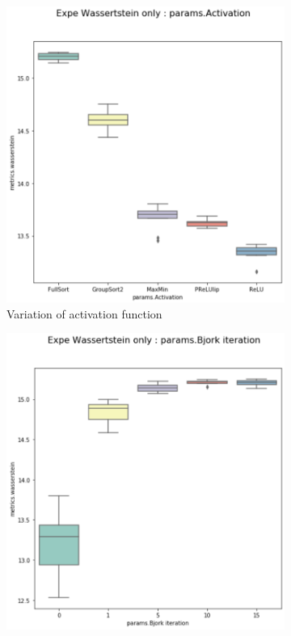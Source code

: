 \begin{figure}
\centering
\begin{subfigure}{.5\textwidth}
  \centering
  \includegraphics[width=1\linewidth]{img/Wassertein_estimation_MLP_activation_param.png}
  \caption{Variation of activation function}
  \label{fig:sub1}
\end{subfigure}%
\begin{subfigure}{.5\textwidth}
  \centering
  \includegraphics[width=1\linewidth]{img/Wassertein_estimation_MLP_bjorck_param.png}

\end{subfigure}
\end{figure}

